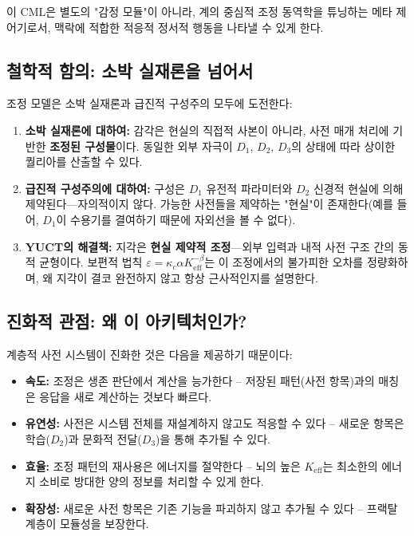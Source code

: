 \documentclass[12pt,a4paper]{article}
\newcommand{\eff}{\mathrm{eff}}
\newcommand{\Ke}{K_{\eff}}
\begin{document}
	이 CML은 별도의 "감정 모듈"이 아니라, 계의 중심적 조정 동역학을 튜닝하는 메타 제어기로서, 맥락에 적합한 적응적 정서적 행동을 나타낼 수 있게 한다.
	
	\subsection{철학적 함의: 소박 실재론을 넘어서}
	
	조정 모델은 소박 실재론과 급진적 구성주의 모두에 도전한다:
	
	\begin{enumerate}
		\item \textbf{소박 실재론에 대하여:} 감각은 현실의 직접적 사본이 아니라, 사전 매개 처리에 기반한 \textbf{조정된 구성물}이다. 동일한 외부 자극이 \(D_1\), \(D_2\), \(D_3\)의 상태에 따라 상이한 퀄리아를 산출할 수 있다.
		
		\item \textbf{급진적 구성주의에 대하여:} 구성은 \(D_1\) 유전적 파라미터와 \(D_2\) 신경적 현실에 의해 제약된다—자의적이지 않다. 가능한 사전들을 제약하는 "현실"이 존재한다(예를 들어, \(D_1\)이 수용기를 결여하기 때문에 자외선을 볼 수 없다).
		
		\item \textbf{YUCT의 해결책:} 지각은 \textbf{현실 제약적 조정}—외부 입력과 내적 사전 구조 간의 동적 균형이다. 보편적 법칙 \(\varepsilon = \kappa_c \alpha \Ke^{-\beta}\)는 이 조정에서의 불가피한 오차를 정량화하며, 왜 지각이 결코 완전하지 않고 항상 근사적인지를 설명한다.
	\end{enumerate}
	
	\subsection{진화적 관점: 왜 이 아키텍처인가?}
	
	계층적 사전 시스템이 진화한 것은 다음을 제공하기 때문이다:
	
	\begin{itemize}
		\item \textbf{속도:} 조정은 생존 판단에서 계산을 능가한다 – 저장된 패턴(사전 항목)과의 매칭은 응답을 새로 계산하는 것보다 빠르다.
		\item \textbf{유연성:} 사전은 시스템 전체를 재설계하지 않고도 적응할 수 있다 – 새로운 항목은 학습(\(D_2\))과 문화적 전달(\(D_3\))을 통해 추가될 수 있다.
		\item \textbf{효율:} 조정 패턴의 재사용은 에너지를 절약한다 – 뇌의 높은 \(\Ke\)는 최소한의 에너지 소비로 방대한 양의 정보를 처리할 수 있게 한다.
		\item \textbf{확장성:} 새로운 사전 항목은 기존 기능을 파괴하지 않고 추가될 수 있다 – 프랙탈 계층이 모듈성을 보장한다.
	\end{itemize}
	
\end{document}
